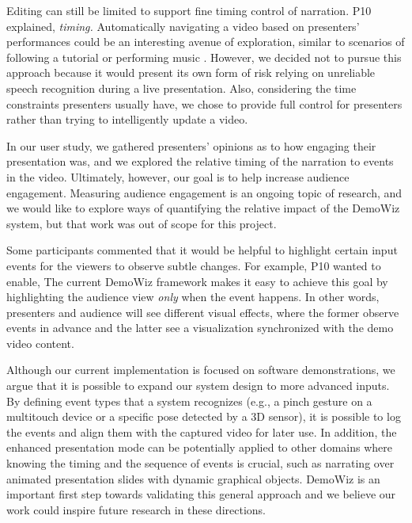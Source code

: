 Editing can still be limited to support fine timing control of narration. P10 explained,  \textit{timing.} Automatically navigating a video based on presenters’ performances could be an interesting avenue of exploration, similar to scenarios of following a tutorial \cite{Pongnumkul:2011ju} or performing music \cite{Lee:2005:IOC:1054972.1055073}. However, we decided not to pursue this approach because it would present its own form of risk relying on unreliable speech recognition during a live presentation. Also, considering the time constraints presenters usually have, we chose to provide full control for presenters rather than trying to intelligently update a video.

In our user study, we gathered presenters’ opinions as to how engaging their presentation was, and we explored the relative timing of the narration to events in the video. Ultimately, however, our goal is to help increase audience engagement. Measuring audience engagement is an ongoing topic of research, and we would like to explore ways of quantifying the relative impact of the DemoWiz system, but that work was out of scope for this project.

Some participants commented that it would be helpful to highlight certain input events for the viewers to observe subtle changes. For example, P10 wanted to enable,  The current DemoWiz framework makes it easy to achieve this goal by highlighting the audience view \textit{only} when the event happens. In other words, presenters and audience will see different visual effects, where the former observe events in advance and the latter see a visualization synchronized with the demo video content.

Although our current implementation is focused on software demonstrations, we argue that it is possible to expand our system design to more advanced inputs. By defining event types that a system recognizes (e.g., a pinch gesture on a multitouch device or a specific pose detected by a 3D sensor), it is possible to log the events and align them with the captured video for later use. In addition, the enhanced presentation mode can be potentially applied to other domains where knowing the timing and the sequence of events is crucial, such as narrating over animated presentation slides with dynamic graphical objects. DemoWiz is an important first step towards validating this general approach and we believe our work could inspire future research in these directions.
